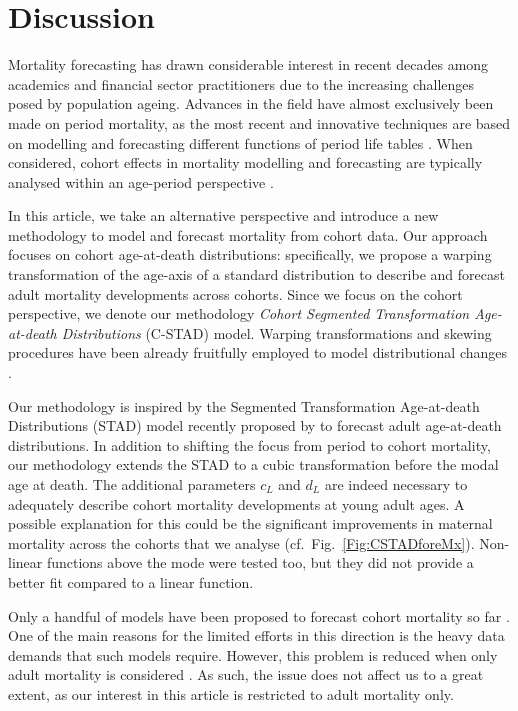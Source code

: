 \documentclass[11pt, a4paper]{article}
\begin{document}
\section{Discussion} 
\label{Sec:Discussion}
Mortality forecasting has drawn considerable interest in recent decades among academics and financial sector practitioners due to the increasing challenges posed by population ageing. Advances in the field have almost exclusively been made on period mortality, as the most recent and innovative techniques are based on modelling and forecasting different functions of period life tables \cite[see, for example,][]{lee1992modeling,cairns2006two,raftery2013bayesian}. When considered, cohort effects in mortality modelling and forecasting are typically analysed within an age-period perspective \citep{renshaw2006cohort,cairns2009quantitative,plat2009stochastic,dokumentov2018bivariate}.  
 
In this article, we take an alternative perspective and introduce a new methodology to model and forecast mortality from cohort data. Our approach focuses on cohort age-at-death distributions: specifically, we propose a warping transformation of the age-axis of a standard distribution to describe and forecast adult mortality developments across cohorts. Since we focus on the cohort perspective, we denote our methodology \emph{Cohort Segmented Transformation Age-at-death Distributions} (C-STAD) model. Warping transformations and skewing procedures have been already fruitfully employed to model distributional changes \cite[see, e.g.,][]{fernandez1998bayesian,camarda2008warped}. 

Our methodology is inspired by the Segmented Transformation Age-at-death Distributions (STAD) model recently proposed by \cite{basellini2019modeling} to forecast adult age-at-death distributions. In addition to shifting the focus from period to cohort mortality, our methodology extends the STAD to a cubic transformation before the modal age at death. The additional parameters $c_L$ and $d_L$ are indeed necessary to adequately describe cohort mortality developments at young adult ages. A possible explanation for this could be the significant improvements in maternal mortality across the cohorts that we analyse (cf.~Fig.~\ref{Fig:CSTADforeMx}). Non-linear functions above the mode were tested too, but they did not provide a better fit compared to a linear function. 

Only a handful of models have been proposed to forecast cohort mortality so far \citep{chiou2009modeling,zanotto2017reconstruction,rizzi2019forecasting}. One of the main reasons for the limited efforts in this direction is the heavy data demands that such models require. However, this problem is reduced when only adult mortality is considered \citep{booth2006demographic}. As such, the issue does not affect us to a great extent, as our interest in this article is restricted to adult mortality only. 
\end{document}
